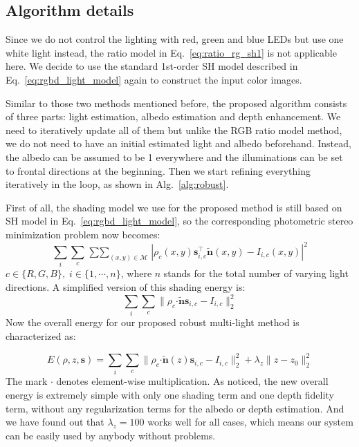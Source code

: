 \subsection{Algorithm details}
Since we do not control the lighting with red, green and blue LEDs but use one white light instead, the ratio model in Eq.~\ref{eq:ratio_rg_sh1} is not applicable here.
We decide to use the standard 1st-order SH model described in Eq.~\ref{eq:rgbd_light_model} again to construct the input color images.

Similar to those two methods mentioned before, the proposed algorithm consists of three parts: light estimation, albedo estimation and depth enhancement. 
We need to iteratively update all of them but unlike the RGB ratio model method, we do not need to have an initial estimated light and albedo beforehand.
Instead, the albedo can be assumed to be 1 everywhere and the illuminations can be set to frontal directions at the beginning.
Then we start refining everything iteratively in the loop, as shown in Alg.~\ref{alg:robust}.

First of all, the shading model we use for the proposed method is still based on SH model in Eq.~\ref{eq:rgbd_light_model}, so the corresponding photometric stereo minimization problem now becomes:
\begin{equation}
    \sum_{i} \sum_{c} \mathop{\sum \sum}_{(x,y) \in \mathcal{M}} |\rho_c(x,y) \mathbf{s}_{i,c}^\top\tilde{\mathbf{n}}(x,y) - I_{i,c}(x,y)|^2 
\end{equation}
$c\in\{R,G,B\},\; i\in\{ 1, \cdots, n\}$, where $n$ stands for the total number of varying light directions.
A simplified version of this shading energy is:
\begin{equation}
    \sum_{i} \sum_{c} \lVert\rho_c \boldsymbol{\cdot} \tilde{\mathbf{n}}\mathbf{s}_{i,c} -  I_{i,c} \rVert_2^2 
\end{equation}
Now the overall energy for our proposed robust multi-light method is characterized as:

\begin{equation}\label{eq:robust_energy}
    E(\rho, z, \mathbf{s}) = \sum_{i} \sum_{c} \lVert \rho_c \boldsymbol{\cdot} \tilde{\mathbf{n}}(z)\mathbf{s}_{i,c}  - I_{i,c}\rVert_2^2  + \lambda_{z}\lVert z - z_0 \rVert_2^2
\end{equation}
The mark $\boldsymbol{\cdot}$ denotes element-wise multiplication. 
As noticed, the new overall energy is extremely simple with only one shading term and one depth fidelity term, without any regularization terms for the albedo or depth estimation.
And we have found out that $\lambda_z = 100$ works well for all cases, which means our system can be easily used by anybody without problems.

